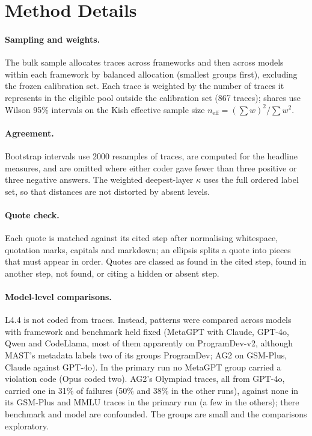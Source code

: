 \documentclass[11pt]{article}
\begin{document}
\section{Method Details}
\label{app:method}

\paragraph{Sampling and weights.} The bulk sample allocates traces across
frameworks and then across models within each framework by balanced allocation
(smallest groups first), excluding the frozen calibration set. Each trace is weighted
by the number of traces it represents in the eligible pool outside the calibration
set (867 traces); shares use Wilson 95\% intervals on the Kish effective sample size
$n_{\mathrm{eff}}=(\sum w)^2/\sum w^2$.

\paragraph{Agreement.} Bootstrap intervals use \num{2000} resamples of traces, are
computed for the headline measures, and are omitted where either coder gave fewer than three positive or three negative
answers. The weighted deepest-layer $\kappa$ uses the full ordered label set, so
that distances are not distorted by absent levels.

\paragraph{Quote check.} Each quote is matched against its cited step after
normalising whitespace, quotation marks, capitals and markdown; an ellipsis splits a
quote into pieces that must appear in order. Quotes are classed as found in the
cited step, found in another step, not found, or citing a hidden or absent step.

\paragraph{Model-level comparisons.} L4.4 is not coded from traces. Instead,
patterns were compared across models with framework and benchmark held fixed
(MetaGPT with Claude, GPT-4o, Qwen and CodeLlama, most of them apparently on
ProgramDev-v2, although MAST's metadata labels two of its groups ProgramDev; AG2
on GSM-Plus, Claude against GPT-4o). In the primary run no MetaGPT group carried a
violation code (Opus coded two). AG2's Olympiad traces, all from GPT-4o, carried
one in 31\% of failures (50\% and 38\% in the other runs), against none in its
GSM-Plus and MMLU traces in the primary run (a few in the others); there benchmark
and model are confounded. The groups are small and the comparisons exploratory.
\end{document}
